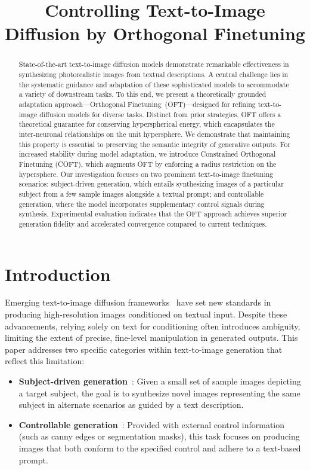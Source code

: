 \title{Controlling Text-to-Image Diffusion by Orthogonal Finetuning}

\begin{abstract}
State-of-the-art text-to-image diffusion models demonstrate remarkable effectiveness in synthesizing photorealistic images from textual descriptions. A central challenge lies in the systematic guidance and adaptation of these sophisticated models to accommodate a variety of downstream tasks. To this end, we present a theoretically grounded adaptation approach—Orthogonal Finetuning~(OFT)—designed for refining text-to-image diffusion models for diverse tasks. Distinct from prior strategies, OFT offers a theoretical guarantee for conserving hyperspherical energy, which encapsulates the inter-neuronal relationships on the unit hypersphere. We demonstrate that maintaining this property is essential to preserving the semantic integrity of generative outputs. For increased stability during model adaptation, we introduce Constrained Orthogonal Finetuning (COFT), which augments OFT by enforcing a radius restriction on the hypersphere. Our investigation focuses on two prominent text-to-image finetuning scenarios: subject-driven generation, which entails synthesizing images of a particular subject from a few sample images alongside a textual prompt; and controllable generation, where the model incorporates supplementary control signals during synthesis. Experimental evaluation indicates that the OFT approach achieves superior generation fidelity and accelerated convergence compared to current techniques.
\end{abstract}

\section{Introduction}

Emerging text-to-image diffusion frameworks~\cite{saharia2022photorealistic,ramesh2022hierarchical,rombach2022high} have set new standards in producing high-resolution images conditioned on textual input. Despite these advancements, relying solely on text for conditioning often introduces ambiguity, limiting the extent of precise, fine-level manipulation in generated outputs. This paper addresses two specific categories within text-to-image generation that reflect this limitation:

\begin{itemize}[leftmargin=*,nosep]

    \item \textbf{Subject-driven generation}~\cite{ruiz2023dreambooth}: Given a small set of sample images depicting a target subject, the goal is to synthesize novel images representing the same subject in alternate scenarios as guided by a text description.
    \item \textbf{Controllable generation}~\cite{zhang2023adding,mou2023t2i}: Provided with external control information (such as canny edges or segmentation masks), this task focuses on producing images that both conform to the specified control and adhere to a text-based prompt.
\end{itemize}


